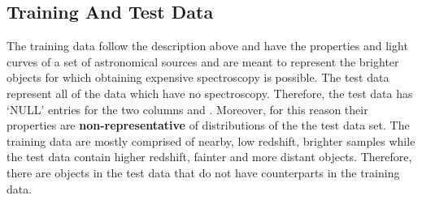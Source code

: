 \documentclass[iop,twocolumn]{emulateapj}
\newcommand{\<}      {\langle}
\renewcommand{\>}    {\rangle}
\begin{document}
\subsection{Training And Test Data}
The training data follow the description above and have the properties and light curves of a set of {\numObjectsTraining} astronomical sources and are meant to represent the brighter objects for which obtaining expensive spectroscopy is possible. The test data represent all of the data which have no spectroscopy.
Therefore, the test data has `NULL' entries for the two columns {\specz} and {\class}. Moreover, for this reason their properties are \textbf{non-representative} of distributions of the
the test data set. The training data are mostly comprised of nearby, low redshift, brighter samples while the test data contain higher redshift, fainter and more distant objects. Therefore, there are objects in the test data that do not have counterparts in the training data.


\end{document}
